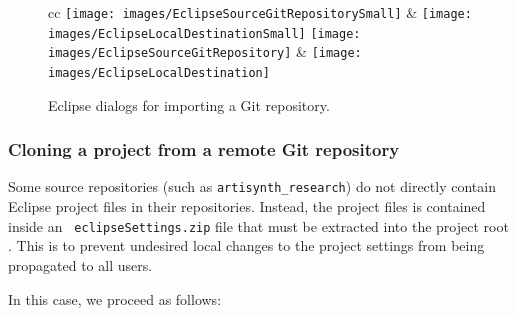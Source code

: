 \begin{figure}[h]
\begin{center}
\begin{tabular}{cc}
\iflatexml
   \texttt{[image: images/EclipseSourceGitRepositorySmall]} &
   \texttt{[image: images/EclipseLocalDestinationSmall]}
\else
   \texttt{[image: images/EclipseSourceGitRepository]} &
   \texttt{[image: images/EclipseLocalDestination]}
\fi   
\end{tabular}
\end{center}
\caption{Eclipse dialogs for importing a Git repository.}%
\label{EclipseGitImport:fig}
\end{figure}

\subsubsection{Cloning a project from a remote Git repository}
\label{cloningFromGit}

Some source repositories (such as {\tt artisynth\_research}) do not
directly contain Eclipse project files in their repositories.
Instead, the project files is contained inside an {\tt
eclipseSettings.zip} file that must be extracted into the project root
\directory{}. This is to prevent undesired local changes to the project
settings from being propagated to all users.

In this case, we proceed as follows:

